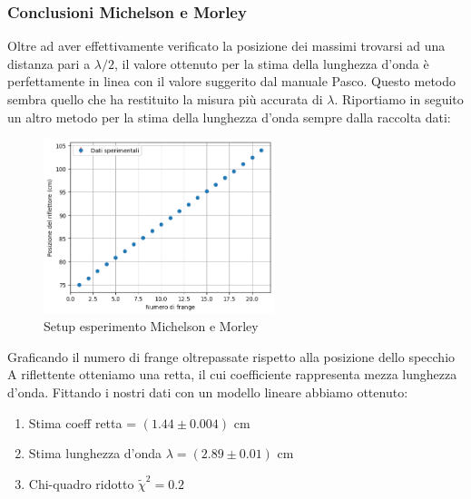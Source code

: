 \documentclass[letterpaper,12pt]{article}
\begin{document}
\subsubsection{Conclusioni Michelson e Morley}
Oltre ad aver effettivamente verificato la posizione dei massimi trovarsi ad una distanza pari a $\lambda/2$, 
il valore ottenuto per la stima della lunghezza d'onda è perfettamente in linea con il valore suggerito dal manuale Pasco.
Questo metodo sembra quello che ha restituito la misura più accurata di $\lambda$. Riportiamo in seguito un altro metodo per la stima 
della lunghezza d'onda sempre dalla raccolta dati:
\begin{figure}[h!]
	\centering
	\includegraphics[width = 0.6\textwidth]{MichelsonGrafico.png}
	\caption{Setup esperimento Michelson e Morley}
	\label{fig:GraficoBragg2}
\end{figure}

Graficando il numero di frange oltrepassate rispetto alla posizione dello specchio A riflettente otteniamo una retta,
il cui coefficiente rappresenta mezza lunghezza d'onda. Fittando i nostri dati con un modello lineare abbiamo ottenuto:
\begin{enumerate}
	\item Stima coeff retta = $(1.44\pm0.004)$ cm
	\item Stima lunghezza d'onda $ \lambda = (2.89\pm0.01)$ cm
	\item Chi-quadro ridotto $\widetilde{\chi}^2 = 0.2$
\end{enumerate}

\newpage
\end{document}
